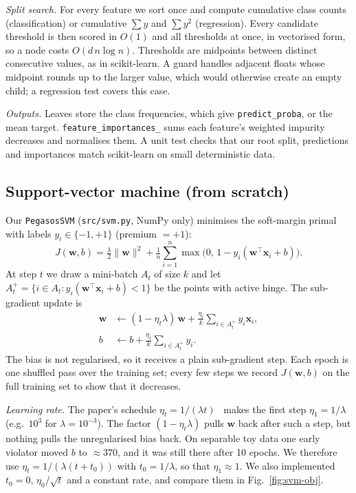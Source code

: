 \documentclass[10pt,twocolumn,a4paper]{article}
\begin{document}
\emph{Split search.} For every feature we sort once and compute
cumulative class counts (classification) or cumulative $\sum y$ and
$\sum y^2$ (regression). Every candidate threshold is then scored in
$O(1)$ and all thresholds at once, in vectorised form, so a node costs
$O(d\,n\log n)$. Thresholds are midpoints between distinct consecutive
values, as in scikit-learn. A guard handles adjacent floats whose midpoint
rounds up to the larger value, which would otherwise create an empty
child; a regression test covers this case.

\emph{Outputs.} Leaves store the class frequencies, which give
\texttt{predict\_proba}, or the mean target. \texttt{feature\_importances\_}
sums each feature's weighted impurity decreases and normalises them. A
unit test checks that our root split, predictions and importances match
scikit-learn on small deterministic data.

\subsection{Support-vector machine (from scratch)}
Our \texttt{PegasosSVM} (\texttt{src/svm.py}, NumPy only) minimises the
soft-margin primal with labels $y_i\in\{-1,+1\}$ (premium $=+1$):
\begin{equation}
  J(\mathbf{w},b)=\tfrac{\lambda}{2}\lVert\mathbf{w}\rVert^{2}
  +\tfrac{1}{n}\sum_{i=1}^{n}\max\!\big(0,\,1-y_i(\mathbf{w}^{\top}\mathbf{x}_i+b)\big).
  \label{eq:svm}
\end{equation}
At step $t$ we draw a mini-batch $A_t$ of size $k$ and let
$A_t^{+}=\{i\in A_t: y_i(\mathbf{w}^{\top}\mathbf{x}_i+b)<1\}$ be the
points with active hinge. The sub-gradient update is
\begin{align}
  \mathbf{w} &\leftarrow (1-\eta_t\lambda)\,\mathbf{w}
     + \tfrac{\eta_t}{k}\textstyle\sum_{i\in A_t^{+}} y_i\mathbf{x}_i,\\
  b &\leftarrow b + \tfrac{\eta_t}{k}\textstyle\sum_{i\in A_t^{+}} y_i .
\end{align}
The bias is not regularised, so it receives a plain sub-gradient step.
Each epoch is one shuffled pass over the training set; every few steps
we record $J(\mathbf{w},b)$ on the full training set to show that it
decreases.

\emph{Learning rate.} The paper's schedule
$\eta_t=1/(\lambda t)$~\cite{pegasos} makes the first step
$\eta_1=1/\lambda$ (e.g.\ $10^{3}$ for $\lambda=10^{-3}$). The factor
$(1-\eta_t\lambda)$ pulls $\mathbf{w}$ back after such a step, but
nothing pulls the unregularised bias back. On separable toy data one
early violator moved $b$ to $\approx 370$, and it was still there after
10 epochs. We therefore use $\eta_t=1/(\lambda(t+t_0))$ with
$t_0=1/\lambda$, so that $\eta_1\approx1$. We also implemented
$t_0=0$, $\eta_0/\sqrt t$ and a constant rate, and compare them in
Fig.~\ref{fig:svm-obj}.
\end{document}
